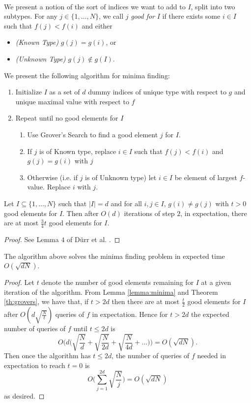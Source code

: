\paragraph{}
We present a notion of the sort of indices we want to add to $I$, split into two subtypes. For any $j \in \{1, \dots, N\}$, we call $j$ {\it good for} $I$ if there exists some $i \in I$ such that $f(j) < f(i)$ and either
\begin{itemize}
\item {\it(Known Type)} $g(j) = g(i)$, or 
\item {\it(Unknown Type)} $g(j) \not\in g(I)$.
\end{itemize}
We present the following algorithm for minima finding:
\begin{enumerate}
\item Initialize $I$ as a set of $d$ dummy indices of unique type with respect to $g$ and unique maximal value with respect to $f$
\item Repeat until no good elements for $I$
	\begin{enumerate}
	\item Use Grover's Search to find a good element $j$ for $I$.
	\item If $j$ is of Known type, replace $i \in I$ such that $f(j) < f(i)$ and $g(j) = g(i)$ with $j$
	\item Otherwise (i.e. if $j$ is of Unknown type) let $i \in I$ be element of largest $f$-value. Replace $i$ with $j$.
	\end{enumerate}
\end{enumerate}
\begin{lemma}\label{lemma:minima}Let $I \subseteq \{1,\dots, N\}$ such that $|I| = d$ and for all $i,j \in I$, $g(i) \neq g(j)$ with $t>0$ good elements for $I$. Then after $O(d)$ iterations of step $2$, in expectation, there are at most $\frac{3}{4}t$ good elements for $I$.
\end{lemma}
\begin{proof}
See Lemma $4$ of D{\"u}rr et al. \cite{durr2004quantum}.
\end{proof}
\begin{theorem}\label{th:minima}
The algorithm above solves the minima finding problem in expected time $O(\sqrt{dN})$.
\end{theorem}
\begin{proof}
Let $t$ denote the number of good elements remaining for $I$ at a given iteration of the algorithm. From Lemma \ref{lemma:minima} and Theorem \ref{th:grovers}, we have that, if $t > 2d$ then there are at most $\frac{t}{2}$ good elements for $I$ after $O(d\sqrt{\frac{N}{t}})$ queries of $f$ in expectation. Hence for $t>2d$ the expected number of queries of $f$ until $t\leq 2d$ is
$$O\big(d\big(\sqrt{\frac{N}{d}} + \sqrt{\frac{N}{2d}} + \sqrt{\frac{N}{4d}} + \dots\big)\big) = O(\sqrt{dN}).$$
Then once the algorithm has $t \leq 2d$, the number of queries of $f$ needed in expectation to reach $t=0$ is
$$O\big(\sum_{j=1}^{2d}\sqrt{\frac{N}{j}}\big) = O(\sqrt{dN})$$
as desired.
\end{proof}
